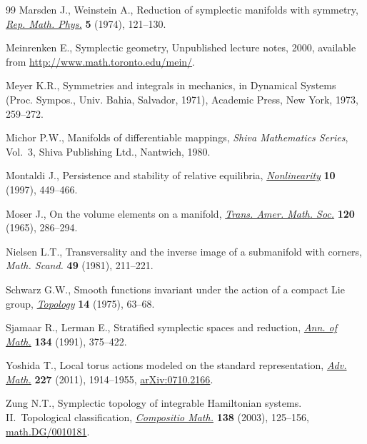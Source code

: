 \begin{thebibliography}{99}
Marsden J., Weinstein A., Reduction of symplectic manifolds with symmetry,
  \href{http://dx.doi.org/10.1016/0034-4877(74)90021-4}{\textit{Rep. Math. Phys.}} \textbf{5} (1974), 121--130.

Meinrenken E., Symplectic geometry, {U}npublished lecture notes, 2000,
  available from \url{http://www.math.toronto.edu/mein/}.

Meyer K.R., Symmetries and integrals in mechanics, in Dynamical Systems
  ({P}roc. {S}ympos., {U}niv. {B}ahia, {S}alvador, 1971), Academic Press, New
  York, 1973, 259--272.

Michor P.W., Manifolds of dif\/ferentiable mappings, \textit{Shiva Mathematics
  Series}, Vol.~3, Shiva Publishing Ltd., Nantwich, 1980.

Montaldi J., Persistence and stability of relative equilibria,
  \href{http://dx.doi.org/10.1088/0951-7715/10/2/009}{\textit{Nonlinearity}} \textbf{10} (1997), 449--466.

Moser J., On the volume elements on a manifold, \href{http://dx.doi.org/10.1090/S0002-9947-1965-0182927-5}{\textit{Trans. Amer. Math.
  Soc.}} \textbf{120} (1965), 286--294.

Nielsen L.T., Transversality and the inverse image of a submanifold with
  corners, \textit{Math. Scand.} \textbf{49} (1981), 211--221.

Schwarz G.W., Smooth functions invariant under the action of a compact {L}ie
  group, \href{http://dx.doi.org/10.1016/0040-9383(75)90036-1}{\textit{Topology}} \textbf{14} (1975), 63--68.

Sjamaar R., Lerman E., Stratif\/ied symplectic spaces and reduction, \href{http://dx.doi.org/10.2307/2944350}{\textit{Ann.
  of Math.}} \textbf{134} (1991), 375--422.

Yoshida T., Local torus actions modeled on the standard representation,
  \href{http://dx.doi.org/10.1016/j.aim.2011.04.007}{\textit{Adv. Math.}} \textbf{227} (2011), 1914--1955, \href{http://arxiv.org/abs/0710.2166}{arXiv:0710.2166}.

Zung N.T., Symplectic topology of integrable {H}amiltonian systems.
  {II}.~{T}opological classif\/ication, \href{http://dx.doi.org/10.1023/A:1026133814607}{\textit{Compositio Math.}} \textbf{138}
  (2003), 125--156, \href{http://arxiv.org/abs/math.DG/0010181}{math.DG/0010181}.

\end{thebibliography}
